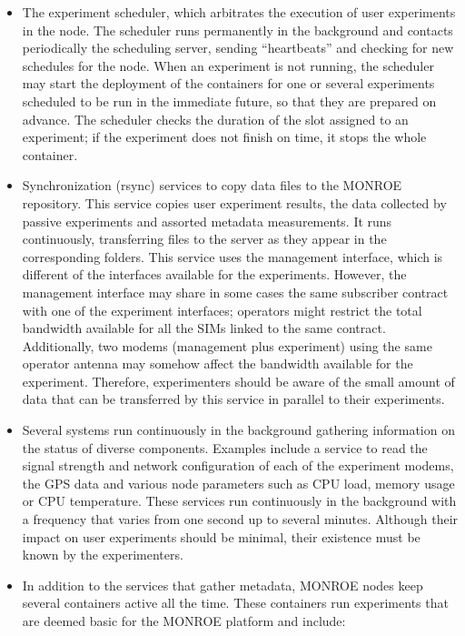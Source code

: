 \documentclass[a4paper,10pt]{article}
\newcommand{\monroe}{MONROE}
\begin{document}
\begin{itemize}
	\item The experiment scheduler, which arbitrates the execution of user experiments in the node. The scheduler runs permanently in the background and contacts periodically the scheduling server, sending ``heartbeats'' and checking for new schedules for the node.
	When an experiment is not running, the scheduler may start the deployment of the containers for one or several experiments scheduled to be run in the immediate future, so that they are prepared on advance.
	The scheduler checks the duration of the slot assigned to an experiment; if the experiment does not finish on time, it stops the whole container.
	\item Synchronization (rsync) services to copy data files to the \monroe{} repository. This service copies user experiment results, the data collected by passive experiments and assorted metadata measurements. It runs continuously, transferring files to the server as they appear in the corresponding folders. This service uses the management interface, which is different of the interfaces available for the experiments. However, the management interface may share in some cases the same subscriber contract with one of the experiment interfaces; operators might restrict the total bandwidth available for all the SIMs linked to the same contract. Additionally, two modems (management plus experiment) using the same operator antenna may somehow affect the bandwidth available for the experiment. Therefore, experimenters should be aware of the small amount of data that can be transferred by this service in parallel to their experiments.
	\item Several systems run continuously in the background gathering information on the status of diverse components. Examples include a service to read the signal strength and network configuration of each of the experiment modems, the GPS data and various node parameters such as CPU load, memory usage or CPU temperature. These services run continuously in the background with a frequency that varies from one second up to several minutes. Although their impact on user experiments should be minimal, their existence must be known by the experimenters.
	\item In addition to the services that gather metadata, \monroe{} nodes keep several containers active all the time. These containers run experiments that are deemed basic for the \monroe{} platform and include:
	\begin{itemize}

\end{itemize}
\end{itemize}
\end{document}

